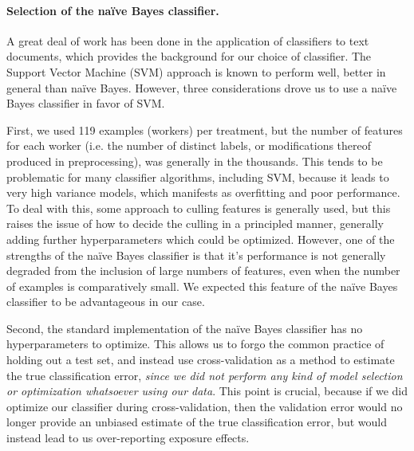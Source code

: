 \documentclass[12pt]{article}
\begin{document}
\paragraph{Selection of the na\"ive Bayes classifier.}
A great deal of work has been done in the application of classifiers to
text documents, which provides the background for our choice of classifier.
The Support Vector Machine (SVM) approach is known to perform well, better in 
general than na\"ive Bayes.  However, three considerations drove us to use
a na\"ive Bayes classifier in favor of SVM.

First, we used 119 examples (workers) per treatment, but the number of 
features
for each worker (i.e. the number of distinct labels, or modifications 
thereof produced in preprocessing), was generally in the thousands.  
This tends to
be problematic for many classifier algorithms, including SVM, because it
leads to very high variance models, which manifests as overfitting and poor
performance.  To deal with this, some approach to culling features is 
generally used, but this raises the issue of how to decide the culling in 
a principled manner, generally adding further hyperparameters which could
be optimized.  However, one of the strengths of the na\"ive Bayes classifier
is that it's performance is not generally degraded from the inclusion of 
large numbers of features, even when the number of examples is comparatively
small.  We expected this feature of the na\"ive Bayes classifier to be 
advantageous in our case.

Second, the standard implementation of the na\"ive Bayes classifier has no 
hyperparameters to optimize.  This allows us to forgo the common practice 
of holding out a test set, and instead use cross-validation as a method to
estimate the true classification error, \textit{since we did not perform
any kind of model selection or optimization whatsoever using our data}.
This point is crucial, because if we did optimize our classifier during 
cross-validation, then the validation error would no longer provide an 
unbiased estimate of the true classification error, but would instead lead
to us over-reporting exposure effects.
\end{document}
